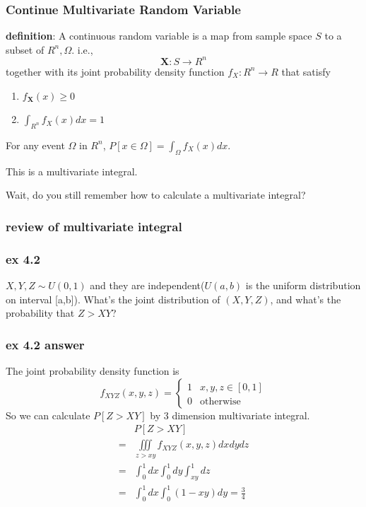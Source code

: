 \documentclass{beamer}
\begin{document}
\begin{frame}
    \frametitle{Continue Multivariate Random Variable}
    \textbf{definition}: A continuous random variable is a map from sample space $S$ to a subset of $R^n, \Omega$. i.e., 
    \[\bm{X}: S\rightarrow R^n\]
    together with its joint probability density function $f_{X}:R^n\rightarrow R$ that satisfy
    \begin{enumerate}
        \item $f_{\bm{X}}(x)\geq 0$
        \item $\int_{R^n}f_{X}(x)dx=1$
    \end{enumerate}
    For any event $\Omega$ in $R^n$, $P[x\in\Omega]=\int_{\Omega}f_{X}(x)dx$.\par
    This is a multivariate integral. \par
    \vspace{0.3cm}
    Wait, do you still remember how to calculate a multivariate integral?

\end{frame}

\begin{frame}
    \frametitle{review of multivariate integral}

    

\end{frame}

\begin{frame}
    \frametitle{ex 4.2}
    $X, Y, Z\sim U(0,1)$ and they are independent($U(a,b)$ is the uniform distribution on interval [a,b]). What's the joint distribution of $(X,Y,Z)$, and what's the probability that $Z>XY$?
    
\end{frame}

\begin{frame}
    \frametitle{ex 4.2 answer}
    The joint probability density function is
    \begin{equation*}
        f_{XYZ}(x,y,z)=
        \begin{cases}
            1 & x,y,z\in[0,1]\\
            0 & \text{otherwise}
        \end{cases}
    \end{equation*}
    So we can calculate $P[Z>XY]$ by 3 dimension multivariate integral.
    \begin{align*}
         & P[Z>XY]\\
        =& \iiint\limits_{z>xy}f_{XYZ}(x,y,z)dxdydz\\
        =& \int_{0}^{1}dx\int_{0}^{1}dy\int_{xy}^1dz\\
        =& \int_{0}^{1}dx\int_{0}^{1}(1-xy) dy=\frac{3}{4}
    \end{align*}

\end{frame}
\end{document}
